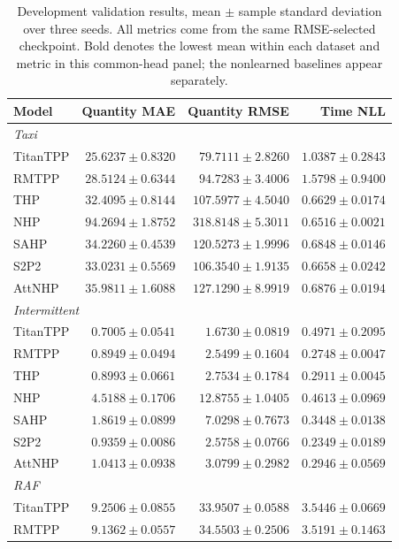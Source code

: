 \documentclass[runningheads]{llncs}
\begin{document}
\begin{table}[p]
\caption{Development validation results, mean $\pm$ sample standard
deviation over three seeds. All metrics come from the same RMSE-selected
checkpoint. Bold denotes the lowest mean within each dataset and metric in
this common-head panel; the nonlearned baselines appear separately.}
\label{tab:main}\centering\small
\begin{tabular}{lrrr}
\toprule
Model & Quantity MAE & Quantity RMSE & Time NLL\\
\midrule
\multicolumn{4}{l}{\textit{Taxi}}\\
TitanTPP & $\mathbf{25.6237\pm0.8320}$ & $\mathbf{79.7111\pm2.8260}$ & $1.0387\pm0.2843$\\
RMTPP & $28.5124\pm0.6344$ & $94.7283\pm3.4006$ & $1.5798\pm0.9400$\\
THP & $32.4095\pm0.8144$ & $107.5977\pm4.5040$ & $0.6629\pm0.0174$\\
NHP & $94.2694\pm1.8752$ & $318.8148\pm5.3011$ & $\mathbf{0.6516\pm0.0021}$\\
SAHP & $34.2260\pm0.4539$ & $120.5273\pm1.9996$ & $0.6848\pm0.0146$\\
S2P2 & $33.0231\pm0.5569$ & $106.3540\pm1.9135$ & $0.6658\pm0.0242$\\
AttNHP & $35.9811\pm1.6088$ & $127.1290\pm8.9919$ & $0.6876\pm0.0194$\\
\midrule
\multicolumn{4}{l}{\textit{Intermittent}}\\
TitanTPP & $\mathbf{0.7005\pm0.0541}$ & $\mathbf{1.6730\pm0.0819}$ & $0.4971\pm0.2095$\\
RMTPP & $0.8949\pm0.0494$ & $2.5499\pm0.1604$ & $0.2748\pm0.0047$\\
THP & $0.8993\pm0.0661$ & $2.7534\pm0.1784$ & $0.2911\pm0.0045$\\
NHP & $4.5188\pm0.1706$ & $12.8755\pm1.0405$ & $0.4613\pm0.0969$\\
SAHP & $1.8619\pm0.0899$ & $7.0298\pm0.7673$ & $0.3448\pm0.0138$\\
S2P2 & $0.9359\pm0.0086$ & $2.5758\pm0.0766$ & $\mathbf{0.2349\pm0.0189}$\\
AttNHP & $1.0413\pm0.0938$ & $3.0799\pm0.2982$ & $0.2946\pm0.0569$\\
\midrule
\multicolumn{4}{l}{\textit{RAF}}\\
TitanTPP & $9.2506\pm0.0855$ & $\mathbf{33.9507\pm0.0588}$ & $3.5446\pm0.0669$\\
RMTPP & $\mathbf{9.1362\pm0.0557}$ & $34.5503\pm0.2506$ & $3.5191\pm0.1463$\\

\end{tabular}
\end{table}
\end{document}
